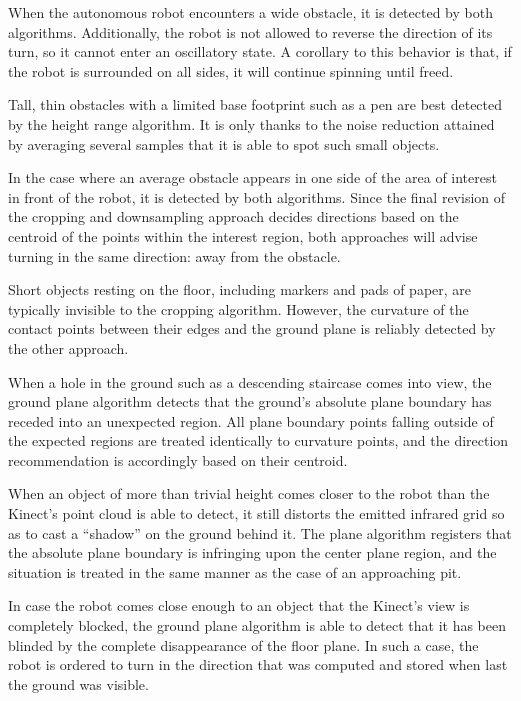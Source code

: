 \documentclass[12pt]{report}
\begin{document}
When the autonomous robot encounters a wide obstacle, it is detected by both algorithms.  Additionally, the robot is not allowed to reverse the direction of its turn, so it cannot enter an oscillatory state.  A corollary to this behavior is that, if the robot is surrounded on all sides, it will continue spinning until freed.

Tall, thin obstacles with a limited base footprint such as a pen are best detected by the height range algorithm.  It is only thanks to the noise reduction attained by averaging several samples that it is able to spot such small objects.

In the case where an average obstacle appears in one side of the area of interest in front of the robot, it is detected by both algorithms.  Since the final revision of the cropping and downsampling approach decides directions based on the centroid of the points within the interest region, both approaches will advise turning in the same direction: away from the obstacle.

Short objects resting on the floor, including markers and pads of paper, are typically invisible to the cropping algorithm.  However, the curvature of the contact points between their edges and the ground plane is reliably detected by the other approach.

When a hole in the ground such as a descending staircase comes into view, the ground plane algorithm detects that the ground's absolute plane boundary has receded into an unexpected region.  All plane boundary points falling outside of the expected regions are treated identically to curvature points, and the direction recommendation is accordingly based on their centroid.

When an object of more than trivial height comes closer to the robot than the Kinect's point cloud is able to detect, it still distorts the emitted infrared grid so as to cast a ``shadow'' on the ground behind it.  The plane algorithm registers that the absolute plane boundary is infringing upon the center plane region, and the situation is treated in the same manner as the case of an approaching pit.

In case the robot comes close enough to an object that the Kinect's view is completely blocked, the ground plane algorithm is able to detect that it has been blinded by the complete disappearance of the floor plane.  In such a case, the robot is ordered to turn in the direction that was computed and stored when last the ground was visible.
\end{document}
